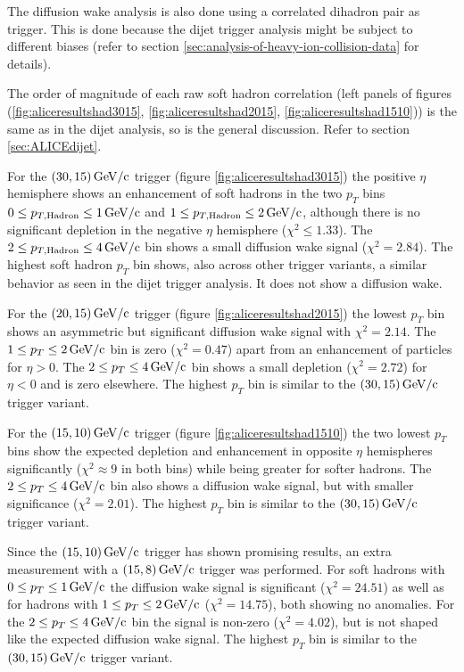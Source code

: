 \documentclass[
  a4paper,
  12pt,
  oneside,
  parskip=half,
  listof=totoc,
  bibliography=totoc,
  DIV=12,
  numbers=noenddot,
  BA.tex
  ]{subfiles}
\begin{document}
The diffusion wake analysis is also done using a correlated dihadron pair as trigger. This is done because the dijet trigger analysis might be subject to different biases (refer to section \ref{sec:analysis-of-heavy-ion-collision-data} for details).

The order of magnitude of each raw soft hadron correlation (left panels of figures (\ref{fig:aliceresultshad3015}, \ref{fig:aliceresultshad2015}, \ref{fig:aliceresultshad1510})) is the same as in the dijet analysis, so is the general discussion. Refer to section \ref{sec:ALICEdijet}.

For the $(30,15)\bunit{GeV/c}$ trigger (figure \ref{fig:aliceresultshad3015}) the positive $\eta$ hemisphere shows an enhancement of soft hadrons in the two $p_T$ bins $0 \leq p_{T,\text{Hadron}} \leq 1 \bunit{GeV/c}$ and $1 \leq p_{T,\text{Hadron}} \leq 2 \bunit{GeV/c}$, although there is no significant depletion in the negative $\eta$ hemisphere ($\chi^2 \leq 1.33$). The $2 \leq p_{T,\text{Hadron}} \leq 4 \bunit{GeV/c}$ bin shows a small diffusion wake signal ($\chi^2 = 2.84$). The highest soft hadron $p_T$ bin shows, also across other trigger variants, a similar behavior as seen in the dijet trigger analysis. It does not show a diffusion wake.

For the $(20,15)\bunit{GeV/c}$ trigger (figure \ref{fig:aliceresultshad2015}) the lowest $p_T$ bin shows an asymmetric but significant diffusion wake signal with $\chi^2 = 2.14$. The $1 \leq p_T \leq 2 \bunit{GeV/c}$ bin is zero ($\chi^2 = 0.47$) apart from an enhancement of particles for $\eta > 0$. The $2 \leq p_T \leq 4 \bunit{GeV/c}$ bin shows a small depletion ($\chi^2 = 2.72$) for $\eta < 0 $ and is zero elsewhere. The highest $p_T$ bin is similar to the $(30,15)\bunit{GeV/c}$ trigger variant.

For the $(15,10)\bunit{GeV/c}$ trigger (figure \ref{fig:aliceresultshad1510}) the two lowest $p_T$ bins show the expected depletion and enhancement in opposite $\eta$ hemispheres significantly ($\chi^2 \approx 9$ in both bins) while being greater for softer hadrons. The $2 \leq p_T \leq 4 \bunit{GeV/c}$ bin also shows a diffusion wake signal, but with smaller significance ($\chi^2 = 2.01$). The highest $p_T$ bin is similar to the $(30,15)\bunit{GeV/c}$ trigger variant.

Since the $(15,10)\bunit{GeV/c}$ trigger has shown promising results, an extra measurement with a $(15,8)\bunit{GeV/c}$ trigger was performed. For soft hadrons with $0 \leq p_T \leq 1\bunit{GeV/c}$ the diffusion wake signal is significant ($\chi^2 = 24.51$) as well as for hadrons with $1 \leq p_T \leq 2 \bunit{GeV/c}$ ($\chi^2 = 14.75$), both showing no anomalies. For the $2 \leq p_T \leq 4 \bunit{GeV/c}$ bin the signal is non-zero ($\chi^2 = 4.02$), but is not shaped like the expected diffusion wake signal. The highest $p_T$ bin is similar to the $(30,15)\bunit{GeV/c}$ trigger variant.
\end{document}
